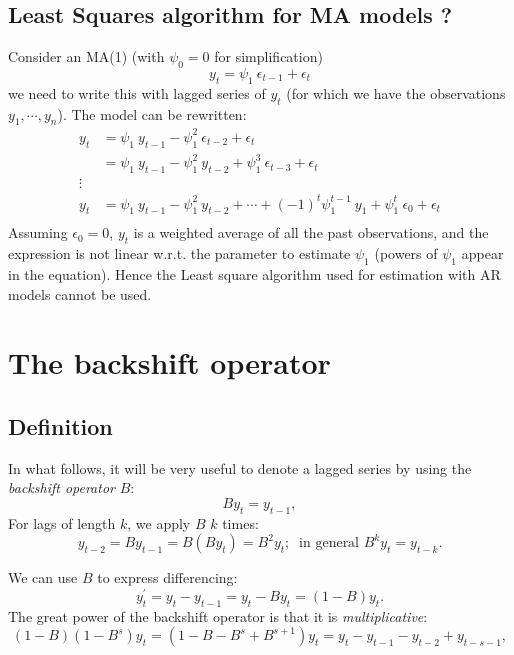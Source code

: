 \documentclass[a4paper,11pt,oneside,onecolumn]{book}
\begin{document}
\section{Least Squares algorithm for MA models ?}
Consider an MA(1) (with $\psi_0=0$ for simplification)
$$
y_t=\psi_1 \ \epsilon_{t-1}+\epsilon_t
$$
we need to write this with lagged series of $y_t$ (for which we have the observations $y_1,\cdots,y_n$).
The model can be rewritten:
$$
\begin{array}{ll}
y_t &=\psi_1\ y_{t-1}-\psi_1^2\ \epsilon_{t-2} +\epsilon_t \\
 &=\psi_1\ y_{t-1}-\psi_1^2\ y_{t-2} +\psi_1^3\ \epsilon_{t-3} +\epsilon_t \\
\vdots&\\
y_t &=\psi_1\ y_{t-1}-\psi_1^2\ y_{t-2} +\cdots+(-1)^{t}\psi_1^{t-1}\ y_{1}+\psi_1^t\ \epsilon_{0}+\epsilon_t \\
\end{array}
$$
Assuming $\epsilon_0=0$, $y_t$ is a weighted average of all the past observations, and the expression is not linear w.r.t. the parameter to estimate $\psi_1$ (powers of $\psi_1$ appear in the equation). Hence the Least square algorithm used for estimation with AR models cannot be used.





\chapter{The backshift operator}
\label{chp:backshift}

\section{Definition}
\begin{definition}
In what follows, it will be very useful to denote a lagged series by
using the {\it backshift operator} $B$:
\[ By_t = y_{t-1}, \]
For lags of length $k$, we apply $B$ $k$ times:
\[ y_{t-2} = By_{t-1} = B(B y_t) = B^2 y_t ; \;\; \mbox{in general } B^k y_t = y_{t-k}. \]
\end{definition}
We can use $B$ to express differencing:
\[ y^{\prime}_t = y_t - y_{t-1} = y_t - By_t = (1-B)y_t. \]
The great power of the backshift operator is that it is {\it
multiplicative}: 
\[ (1-B)(1-B^s)y_t = (1 - B - B^s + B^{s+1})y_t = y_t - y_{t-1} - y_{t-2} + y_{t-s-1}, \]
\end{document}
